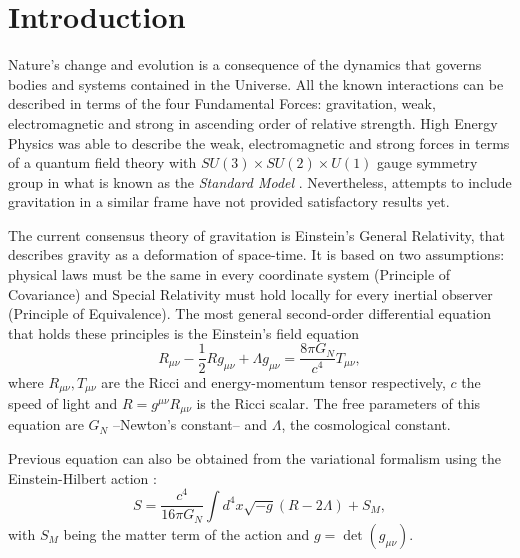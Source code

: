 \chapter{Introduction}
\label{ch:introduction}
Nature's change and evolution is a consequence of the dynamics that governs bodies and systems contained in the Universe. All the known interactions can be described in terms of the four Fundamental Forces: gravitation, weak, electromagnetic and strong in ascending order of relative strength. High Energy Physics was able to describe the weak, electromagnetic and strong forces in terms of a quantum field theory with $SU(3)\times SU(2)\times U(1)$ gauge symmetry group in what is known as the {\it Standard Model} \cite{halzen1984quarks,peskin1995introduction,weinberg1995quantum,weinberg1996quantum,2000hep.ph....1283N}. Nevertheless, attempts to include gravitation in a similar frame have not provided satisfactory results yet.
\newline

The current consensus theory of gravitation is Einstein's General Relativity, that describes gravity as a deformation of space-time. It is based on two assumptions: physical laws must be the same in every coordinate system (Principle of Covariance) and Special Relativity must hold locally for every inertial observer (Principle of Equivalence). The most general second-order differential equation that holds these principles is the Einstein's field equation \cite{ANDP:ANDP19163540702,1916AnP...354..769E,1917SPAW.......142E,2001LRR.....4....1C}
\begin{equation}
R_{\mu\nu}-\frac{1}{2}Rg_{\mu\nu} + \Lambda g_{\mu\nu} = \frac{8\pi G_N}{c^4}T_{\mu\nu},
\label{eq:einsteinbare}
\end{equation}
where $R_{\mu\nu},T_{\mu\nu}$ are the Ricci and energy-momentum tensor respectively, $c$ the speed of light and $R=g^{\mu\nu}R_{\mu\nu}$ is the Ricci scalar. The free parameters of this equation are $G_N$ --Newton's constant-- and $\Lambda$, the cosmological constant.
\newline

Previous equation can also be obtained from the variational formalism using the Einstein-Hilbert action \cite{Hilbert:1915tx}:
\begin{equation}
S = \frac{c^4}{16\pi G_N}\int d^4x\sqrt{-g}(R-2\Lambda)+S_M,
\label{eq:ehaction}
\end{equation}
with $S_M$ being the matter term of the action and $g=\det(g_{\mu\nu})$.


